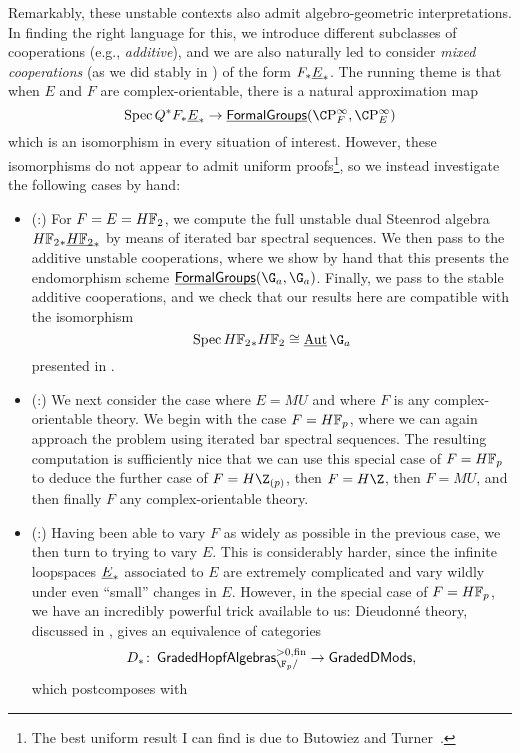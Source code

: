 Remarkably, these unstable contexts also admit algebro-geometric interpretations.  In finding the right language for this, we introduce different subclasses of cooperations (e.g., \textit{additive}), and we are also naturally led to consider \textit{mixed cooperations} (as we did stably in ) of the form $F_* \underline{\smash{E}}_{*}$.  The running theme is that when $E$ and $F$ are complex-orientable, there is a natural approximation map \[\Spec Q^* F_* \OS{E}{*} \to \InternalHom{FormalGroups}(\CP^\infty_F, \CP^\infty_E)\] which is an isomorphism in every situation of interest.  However, these isomorphisms do not appear to admit uniform proofs\footnote{The best uniform result I can find is due to Butowiez and Turner~\cite[Theorem 3.12]{ButowiezTurner}.}, so we instead investigate the following cases by hand:
\begin{itemize}
\item (:) For $F = E = \HFtwo$, we compute the full unstable dual Steenrod algebra $\HFtwo_* \OS{\HFtwo}{*}$ by means of iterated bar spectral sequences.  We then pass to the additive unstable cooperations, where we show by hand that this presents the endomorphism scheme $\InternalHom{FormalGroups}(\G_a, \G_a)$.  Finally, we pass to the stable additive cooperations, and we check that our results here are compatible with the isomorphism \[\Spec \HFtwo_* \HFtwo \cong \InternalAut{\G_a}\] presented in .
\item (:) We next consider the case where $E = MU$ and where $F$ is any complex-orientable theory.  We begin with the case $F = \HFp$, where we can again approach the problem using iterated bar spectral sequences.  The resulting computation is sufficiently nice that we can use this special case of $F = \HFp$ to deduce the further case of $F = H\Z_{(p)}$, then $F = H\Z$, then $F = MU$, and then finally $F$ any complex-orientable theory.
\item (:) Having been able to vary $F$ as widely as possible in the previous case, we then turn to trying to vary $E$.  This is considerably harder, since the infinite loopspaces $\underline{\smash{E}}_{*}$ associated to $E$ are extremely complicated and vary wildly under even ``small'' changes in $E$.  However, in the special case of $F = \HFp$, we have an incredibly powerful trick available to us: Dieudonn\'e theory, discussed in , gives an equivalence of categories \[D_*\co \CatOf{GradedHopfAlgebras}^{> 0, \fin}_{\F_p/} \to \CatOf{GradedDMods},\] which postcomposes with

\end{itemize}
